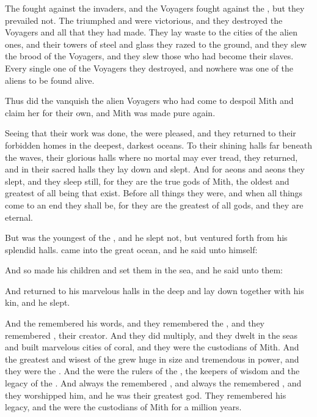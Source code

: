 The \krakens{} fought against the invaders, and the Voyagers fought against the \krakens{}, but they prevailed not. The \krakens{} triumphed and were victorious, and they destroyed the Voyagers and all that they had made. They lay waste to the cities of the alien ones, and their towers of steel and glass they razed to the ground, and they slew the brood of the Voyagers, and they slew those who had become their slaves. Every single one of the Voyagers they destroyed, and nowhere was one of the aliens to be found alive. 

Thus did the \krakens{} vanquish the alien Voyagers who had come to despoil Mith and claim her for their own, and Mith was made pure again. 

Seeing that their work was done, the \krakens{} were pleased, and they returned to their forbidden homes in the deepest, darkest oceans. To their shining halls far beneath the waves, their glorious halls where no mortal may ever tread, they returned, and in their sacred halls they lay down and slept. And for aeons and aeons they slept, and they sleep still, for they are the true gods of Mith, the oldest and greatest of all being that exist. Before all things they were, and when all things come to an end they shall be, for they are the greatest of all gods, and they are eternal. 

But \Moroch{} was the youngest of the \krakens{}, and he slept not, but ventured forth from his splendid halls. \Moroch{} came into the great ocean, and he said unto himself: 

And so \Moroch{} made his children and set them in the sea, and he said unto them: 

And \Moroch{} returned to his marvelous halls in the deep and lay down together with his kin, and he slept. 

And the \nagae{} remembered his words, and they remembered the \krakens, and they remembered \Moroch, their creator. And they did multiply, and they dwelt in the seas and built marvelous cities of coral, and they were the custodians of Mith. And the greatest and wisest of the \nagae{} grew huge in size and tremendous in power, and they were the \leviathans. And the \leviathans{} were the rulers of the \nagae{}, the keepers of wisdom and the legacy of the \krakens{}. And always the \leviathans{} remembered \Moroch, and always the \nagae{} remembered \Moroch, and they worshipped him, and he was their greatest god. They remembered his legacy, and the \nagae{} were the custodians of Mith for a million years.

